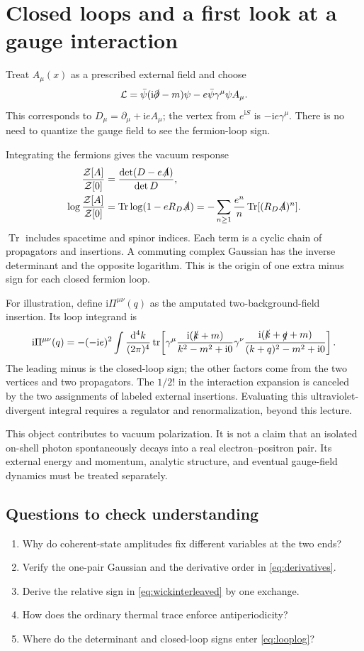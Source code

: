 \documentclass[11pt]{article}
\newcommand{\dd}{\mathrm d}
\newcommand{\ii}{\mathrm i}
\newcommand{\tr}{\operatorname{tr}}
\newcommand{\Tr}{\operatorname{Tr}}
\newcommand{\module}[1]{\clearpage\section{#1}}
\begin{document}
\module{Closed loops and a first look at a gauge interaction}
Treat \(A_\mu(x)\) as a prescribed external field and choose
\begin{equation}
 \mathcal L=\bar\psi(\ii\slashed\partial-m)\psi
 -e\bar\psi\gamma^\mu\psi A_\mu.
\end{equation}
This corresponds to \(D_\mu=\partial_\mu+\ii eA_\mu\); the vertex
from \(e^{\ii S}\) is \(-\ii e\gamma^\mu\). There is no need to
quantize the gauge field to see the fermion-loop sign.

Integrating the fermions gives the vacuum response
\begin{align}
 \frac{\mathcal Z[A]}{\mathcal Z[0]}
 &=\frac{\det(D-e\slashed A)}{\det D},\\
 \log\frac{\mathcal Z[A]}{\mathcal Z[0]}
 &=\Tr\log(1-eR_D\slashed A)
 =-\sum_{n\geq1}\frac{e^n}{n}\Tr[(R_D\slashed A)^n]. \label{eq:looplog}
\end{align}
\(\Tr\) includes spacetime and spinor indices. Each term is a cyclic
chain of propagators and insertions. A commuting complex Gaussian
has the inverse determinant and the opposite logarithm. This is the
origin of one extra minus sign for each closed fermion loop.

For illustration, define \(\ii\Pi^{\mu\nu}(q)\) as the amputated
two-background-field insertion. Its loop integrand is
\begin{equation}
 \ii\Pi^{\mu\nu}(q)=-( -\ii e)^2
 \int\frac{\dd^4k}{(2\pi)^4}
 \tr\!\left[
 \gamma^\mu\frac{\ii(\slashed k+m)}{k^2-m^2+\ii0}
 \gamma^\nu\frac{\ii(\slashed k+\slashed q+m)}{(k+q)^2-m^2+\ii0}
 \right].                                            \label{eq:polarization}
\end{equation}
The leading minus is the closed-loop sign; the other factors come
from the two vertices and two propagators. The \(1/2!\) in the
interaction expansion is canceled by the two assignments of labeled
external insertions. Evaluating this ultraviolet-divergent integral
requires a regulator and renormalization, beyond this lecture.

This object contributes to vacuum polarization. It is not a claim
that an isolated on-shell photon spontaneously decays into a real
electron--positron pair. Its external energy and momentum, analytic
structure, and eventual gauge-field dynamics must be treated separately.

\subsection*{Questions to check understanding}
\begin{enumerate}
\item Why do coherent-state amplitudes fix different variables at the two ends?
\item Verify the one-pair Gaussian and the derivative order in \eqref{eq:derivatives}.
\item Derive the relative sign in \eqref{eq:wickinterleaved} by one exchange.
\item How does the ordinary thermal trace enforce antiperiodicity?
\item Where do the determinant and closed-loop signs enter \eqref{eq:looplog}?
\end{enumerate}
\end{document}
